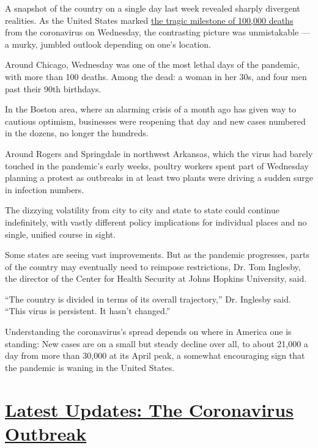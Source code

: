 A snapshot of the country on a single day last week revealed sharply
divergent realities. As the United States marked
\href{https://www.nytimes3xbfgragh.onion/interactive/2020/05/24/us/us-coronavirus-deaths-100000.html}{the
tragic milestone of 100,000 deaths} from the coronavirus on Wednesday,
the contrasting picture was unmistakable --- a murky, jumbled outlook
depending on one's location.

Around Chicago, Wednesday was one of the most lethal days of the
pandemic, with more than 100 deaths. Among the dead: a woman in her 30s,
and four men past their 90th birthdays.

In the Boston area, where an alarming crisis of a month ago has given
way to cautious optimism, businesses were reopening that day and new
cases numbered in the dozens, no longer the hundreds.

Around Rogers and Springdale in northwest Arkansas, which the virus had
barely touched in the pandemic's early weeks, poultry workers spent part
of Wednesday planning a protest as outbreaks in at least two plants were
driving a sudden surge in infection numbers.

The dizzying volatility from city to city and state to state could
continue indefinitely, with vastly different policy implications for
individual places and no single, unified course in sight.

Some states are seeing vast improvements. But as the pandemic
progresses, parts of the country may eventually need to reimpose
restrictions, Dr. Tom Inglesby, the director of the Center for Health
Security at Johns Hopkins University, said.

``The country is divided in terms of its overall trajectory,'' Dr.
Inglesby said. ``This virus is persistent. It hasn't changed.''

Understanding the coronavirus's spread depends on where in America one
is standing: New cases are on a small but steady decline over all, to
about 21,000 a day from more than 30,000 at its April peak, a somewhat
encouraging sign that the pandemic is waning in the United States.

\hypertarget{latest-updates-the-coronavirus-outbreak}{%
\section{\texorpdfstring{\href{https://www.nytimes3xbfgragh.onion/2020/09/11/world/covid-19-coronavirus.html?action=click\&pgtype=Article\&state=default\&region=MAIN_CONTENT_1\&context=storylines_live_updates}{Latest
Updates: The Coronavirus
Outbreak}}{Latest Updates: The Coronavirus Outbreak}}\label{latest-updates-the-coronavirus-outbreak}}

